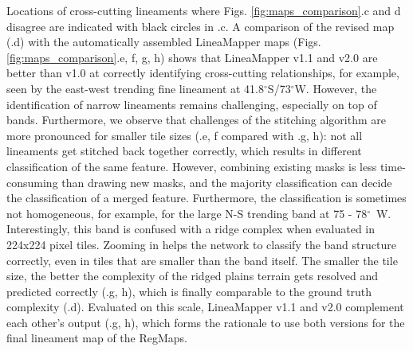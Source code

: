 Locations of cross-cutting lineaments where Figs. \ref{fig:maps_comparison}.c and d disagree are indicated with black circles in .c. A comparison of the revised map (.d) with the automatically assembled LineaMapper maps (Figs. \ref{fig:maps_comparison}.e, f, g, h) shows that LineaMapper v1.1 and v2.0 are better than v1.0 at correctly identifying cross-cutting relationships, for example, seen by the east-west trending fine lineament at 41.8$^{\circ}$S/73$^{\circ}$W. However, the identification of narrow lineaments remains challenging, especially on top of bands.
Furthermore, we observe that challenges of the stitching algorithm are more pronounced for smaller tile sizes (.e, f compared with .g, h): not all lineaments get stitched back together correctly, which results in different classification of the same feature. However, combining existing masks is less time-consuming than drawing new masks, and the majority classification can decide the classification of a merged feature. 
Furthermore, the classification is sometimes not homogeneous, for example, for the large N-S trending band at 75 - 78$^{\circ}$~W. Interestingly, this band is confused with a ridge complex when evaluated in 224x224 pixel tiles. Zooming in helps the network to classify the band structure correctly, even in tiles that are smaller than the band itself. The smaller the tile size, the better the complexity of the ridged plains terrain gets resolved and predicted correctly (.g, h), which is finally comparable to the ground truth complexity (.d). Evaluated on this scale, LineaMapper v1.1 and v2.0 complement each other's output (.g, h), which forms the rationale to use both versions for the final lineament map of the RegMaps.


